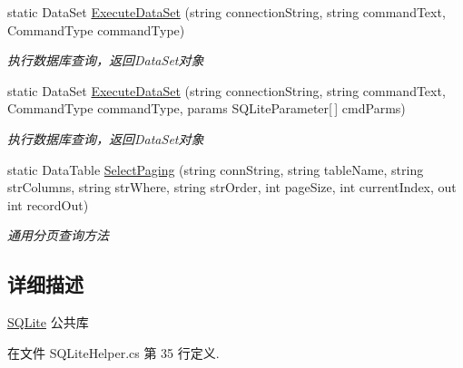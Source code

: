 \begin{DoxyCompactItemize}
static Data\-Set \hyperlink{class_x_c_l_net_tools_1_1_data_base_1_1_s_q_lite_1_1_s_q_lite_helper_a4806433651289941b9507696bb3a64d0}{Execute\-Data\-Set} (string connection\-String, string command\-Text, Command\-Type command\-Type)
\begin{DoxyCompactList}\small\item\em 执行数据库查询，返回\-Data\-Set对象 \end{DoxyCompactList}\item 
static Data\-Set \hyperlink{class_x_c_l_net_tools_1_1_data_base_1_1_s_q_lite_1_1_s_q_lite_helper_a58876af7deacc80974cddb8b1feddee5}{Execute\-Data\-Set} (string connection\-String, string command\-Text, Command\-Type command\-Type, params S\-Q\-Lite\-Parameter\mbox{[}$\,$\mbox{]} cmd\-Parms)
\begin{DoxyCompactList}\small\item\em 执行数据库查询，返回\-Data\-Set对象 \end{DoxyCompactList}\item 
static Data\-Table \hyperlink{class_x_c_l_net_tools_1_1_data_base_1_1_s_q_lite_1_1_s_q_lite_helper_ac6c40082dce532c8ea61efc23c00a825}{Select\-Paging} (string conn\-String, string table\-Name, string str\-Columns, string str\-Where, string str\-Order, int page\-Size, int current\-Index, out int record\-Out)
\begin{DoxyCompactList}\small\item\em 通用分页查询方法 \end{DoxyCompactList}\end{DoxyCompactItemize}


\subsection{详细描述}
\hyperlink{namespace_x_c_l_net_tools_1_1_data_base_1_1_s_q_lite}{S\-Q\-Lite} 公共库 



在文件 S\-Q\-Lite\-Helper.\-cs 第 35 行定义.



